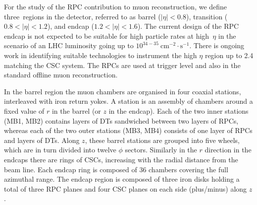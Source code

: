 \documentclass{JINST}
\begin{document}
For the study of the RPC contribution to muon reconstruction, we define three~regions in the detector, referred to as barrel ($|\eta|<0.8$), transition ($0.8<|\eta|<1.2$), and endcap ($1.2<|\eta|<1.6$).
The current design of the RPC endcap is not expected to be suitable for high particle rates at high~$\eta$ in the scenario of an LHC luminosity going up to $10^{34-35}~{\mathrm{cm}}^{-2} \cdot {\mathrm{s}}^{-1}$. There is ongoing work in identifying suitable technologies to instrument the high $\eta$ region %
up to 2.4 matching the CSC system.
The RPCs are used at trigger level and also in the standard offline muon reconstruction.

In the barrel region the muon chambers are organised in four coaxial stations,
interleaved with iron return yokes.
A station is an assembly of chambers around a fixed value of $r$ in the barrel (or $z$ in the endcap).
Each of the two inner stations (MB1, MB2) contains layers of DTs sandwiched between two layers of RPCs, whereas each of the two outer stations (MB3, MB4) consists of one layer of RPCs and layers of DTs.
Along $z$, these barrel stations are grouped into five wheels, which are in turn divided into twelve $\phi$ sectors.
Similarly in the $r$ direction in the endcaps there are rings of CSCs, increasing with the radial distance from the beam line.
Each endcap ring is composed of 36 chambers covering the full azimuthal range.
The endcap region is composed of three iron disks holding a total of three RPC planes and four CSC planes on each side (plus/minus) along $z$. %
\end{document}
